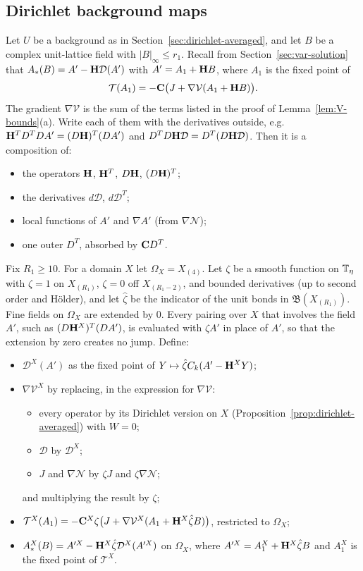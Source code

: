 \subsection{Dirichlet background maps}

Let $U$ be a background as in Section~\ref{sec:dirichlet-averaged}, and let $B$ be a complex unit-lattice field with $|B|_\infty\le r_1$. Recall from Section~\ref{sec:var-solution} that $A_*(B)=A'-\mathbf H\mathcal D(A')$ with $A'=A_1+\mathbf H B$, where $A_1$ is the fixed point of
\[
\mathcal T(A_1)=-\mathbf C\big(J+\nabla\mathcal V(A_1+\mathbf H B)\big).
\]
The gradient $\nabla\mathcal V$ is the sum of the terms listed in the proof of Lemma~\ref{lem:V-bounds}(a). Write each of them with the derivatives outside, e.g.\ $\mathbf H^TD^TDA'=(D\mathbf H)^T(DA')$ and $D^TD\mathbf H\mathcal D=D^T(D\mathbf H\mathcal D)$. Then it is a composition of:
\begin{itemize}
\item the operators $\mathbf H$, $\mathbf H^T$, $D\mathbf H$, $(D\mathbf H)^T$;
\item the derivatives $d\mathcal D$, $d\mathcal D^T$;
\item local functions of $A'$ and $\nabla A'$ (from $\nabla\mathcal N$);
\item one outer $D^T$, absorbed by $\mathbf C D^T$.
\end{itemize}

\begin{definition}\label{def:dirichlet-map}
Fix $R_1\ge10$. For a domain $X$ let $\Omega_X=X_{(4)}$. Let $\zeta$ be a smooth function on $\mathbb T_\eta$ with $\zeta=1$ on $X_{(R_1)}$, $\zeta=0$ off $X_{(R_1-2)}$, and bounded derivatives (up to second order and H\"older), and let $\hat\zeta$ be the indicator of the unit bonds in $\mathfrak B(X_{(R_1)})$. Fine fields on $\Omega_X$ are extended by $0$. Every pairing over $X$ that involves the field $A'$, such as $(D\mathbf H^X)^T(DA')$, is evaluated with $\zeta A'$ in place of $A'$, so that the extension by zero creates no jump. Define:
\begin{itemize}
\item $\mathcal D^X(A')$ as the fixed point of $Y\mapsto\hat\zeta C_k(A'-\mathbf H^XY)$;
\item $\nabla\mathcal V^X$ by replacing, in the expression for $\nabla\mathcal V$:
  \begin{itemize}
  \item every operator by its Dirichlet version on $X$ (Proposition~\ref{prop:dirichlet-averaged}) with $W=0$;
  \item $\mathcal D$ by $\mathcal D^X$;
  \item $J$ and $\nabla\mathcal N$ by $\zeta J$ and $\zeta\nabla\mathcal N$;
  \end{itemize}
  and multiplying the result by $\zeta$;
\item $\mathcal T^X(A_1)=-\mathbf C^X\zeta\big(J+\nabla\mathcal V^X(A_1+\mathbf H^X\hat\zeta B)\big)$, restricted to $\Omega_X$;
\item $A^X_*(B)=A'^X-\mathbf H^X\hat\zeta\mathcal D^X(A'^X)$ on $\Omega_X$, where $A'^X=A^X_1+\mathbf H^X\hat\zeta B$ and $A^X_1$ is the fixed point of $\mathcal T^X$.
\end{itemize}
\end{definition}

